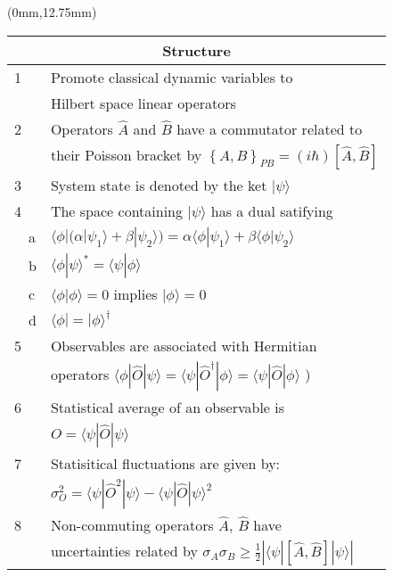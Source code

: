 \documentclass[10pt]{article}
\begin{document}
\begin{textblock*}{65mm}(0mm,12.75mm)
\begin{tabular}{|l l|}\hline
\multicolumn{2}{|c|}{\bf Structure} \\
\hline 
1  & Promote classical dynamic variables to\\
   & Hilbert space linear operators \hfill\\
2  & Operators $\hat A$ and $\hat B$ have a commutator related to \\
   & their Poisson bracket by $\left\{ A, B \right\}_{PB} = \left( i \hbar \right) \left[ \hat A, \hat B \right]$\\
3  & System state is denoted by the ket $| \psi \rangle$ \\
4  & The space containing $| \psi \rangle$ has a dual satifying\\
~~a& $ \langle \phi | \big( \alpha | \psi_1 \rangle + \beta | \psi_2 \rangle \big) 
     = \alpha \langle \phi | \psi_1 \rangle + \beta \langle \phi | \psi_2 \rangle$ \\
~~b& $\langle \phi | \psi \rangle ^* = \langle \psi | \phi \rangle$ \\
~~c& $\langle \phi | \phi \rangle = 0$ implies $| \phi \rangle = 0$ \\
~~d& $\langle \phi | = | \phi \rangle ^{\dagger}$ \\
5  & Observables are associated with Hermitian \\
   & operators $\langle \phi | \hat O | \psi \rangle
        = \langle \psi | \hat O ^ \dagger | \phi \rangle 
        = \langle \psi | \hat O | \phi \rangle$ )\\
6  & Statistical average of an observable is \\
   &$O = \langle \psi | \hat O | \psi \rangle$\\
7  & Statisitical fluctuations are given by:\\
   &$\sigma_{O}^2 = \langle \psi | \hat O ^2 | \psi \rangle 
     - \langle \psi | \hat O | \psi \rangle ^2$ \\
8  &Non-commuting operators $\hat A$, $\hat B$ have\\
   &uncertainties related by $ \sigma_A \sigma_B 
    \ge \frac{1}{2} \left| \langle \psi | [ \hat A , \hat B ] | \psi \rangle \right|$\\
\hline
\end{tabular}
\end{textblock*}
\end{document}
